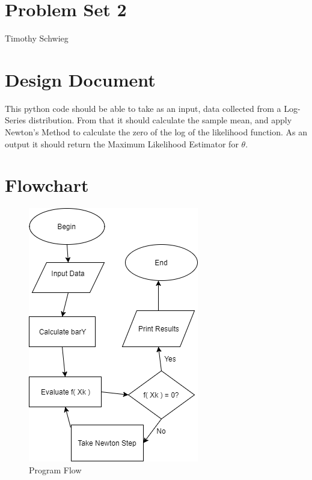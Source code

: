 \documentclass{paper}
\begin{document}

\section*{ Problem Set 2 }
Timothy Schwieg
\section*{ Design Document}
This python code should be able to take as an input, data collected from a Log-Series distribution. From that it should calculate the sample mean, and apply Newton's Method to calculate the zero of the log of the likelihood function. As an output it should return the Maximum Likelihood Estimator for $\theta$.

\section*{Flowchart}
\begin{figure}[H]
\centering\includegraphics[height=1\textwidth]{FlowChart.png}
\caption{Program Flow}
\end{figure}
\end{document}
